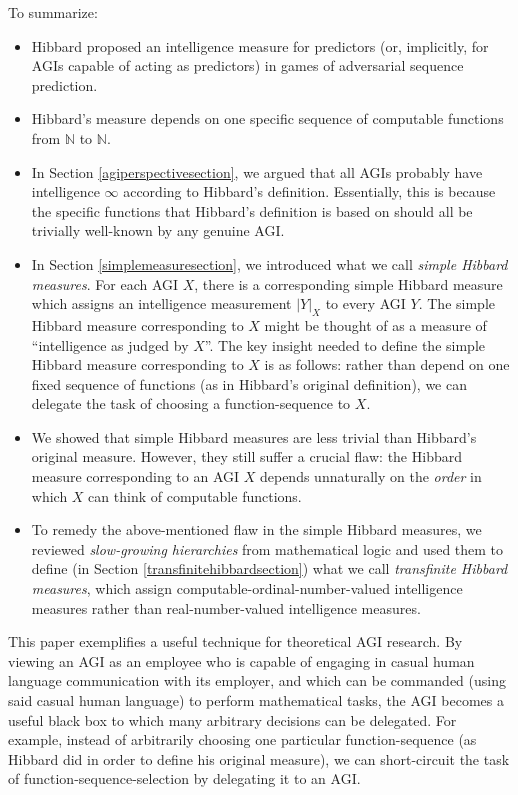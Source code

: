 \documentclass{article}
\begin{document}
To summarize:
\begin{itemize}
    \item
    Hibbard proposed \cite{hibbard} an intelligence measure for predictors (or, implicitly,
    for AGIs capable of acting as predictors) in games of adversarial sequence prediction.
    \item
    Hibbard's measure depends on one specific sequence of computable functions from $\mathbb N$
    to $\mathbb N$.
    \item
    In Section \ref{agiperspectivesection}, we argued that all AGIs probably have
    intelligence $\infty$ according to Hibbard's definition. Essentially, this is because
    the specific functions that Hibbard's definition is based on should all be trivially
    well-known by any genuine AGI.
    \item
    In Section \ref{simplemeasuresection}, we introduced what we call \emph{simple Hibbard
    measures}. For each AGI $X$, there is a corresponding simple Hibbard measure which
    assigns an intelligence measurement $|Y|_X$ to every AGI $Y$. The simple Hibbard
    measure corresponding to $X$ might be thought of as a measure of ``intelligence as
    judged by $X$''. The key insight needed to define the simple Hibbard measure corresponding
    to $X$ is as follows: rather than depend on one fixed sequence of functions (as in
    Hibbard's original definition), we can delegate the task of choosing a function-sequence
    to $X$.
    \item
    We showed that simple Hibbard measures are less trivial than Hibbard's original measure.
    However, they still suffer a crucial flaw: the Hibbard measure corresponding to an
    AGI $X$ depends unnaturally on the \emph{order} in which $X$ can think of
    computable functions.
    \item
    To remedy the above-mentioned flaw in the simple Hibbard measures, we reviewed
    \emph{slow-growing hierarchies} from mathematical logic and used them to define
    (in Section \ref{transfinitehibbardsection}) what
    we call \emph{transfinite Hibbard measures}, which assign
    computable-ordinal-number-valued
    intelligence measures rather than real-number-valued intelligence measures.
\end{itemize}

This paper exemplifies a useful technique for theoretical AGI research.
By viewing an AGI as an employee who is capable of engaging in casual human
language communication with its employer, and which can be commanded (using said
casual human language) to perform mathematical tasks, the AGI becomes a useful
black box to which many arbitrary decisions can be delegated. For example, instead
of arbitrarily choosing one particular function-sequence (as Hibbard did in order
to define his original measure), we can short-circuit the task of
function-sequence-selection by delegating it to an AGI.




\end{document}
